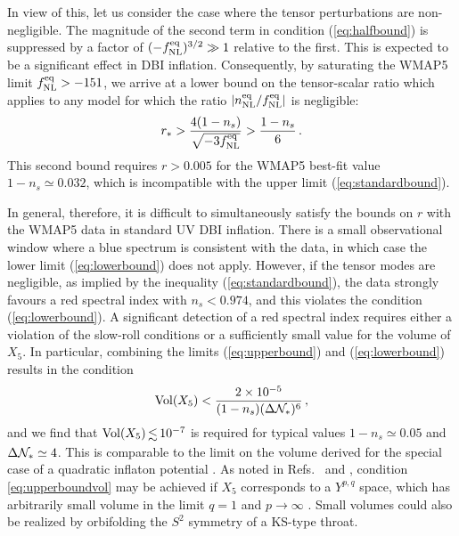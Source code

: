 In view of this, let us consider the case where the tensor 
perturbations are non-negligible. 
The magnitude of the second term in condition (\ref{eq:halfbound}) 
is suppressed by a factor of $(-f_{\mathrm{NL}}^{\mathrm{eq}})^{3/2} \gg 1$ 
relative to the first. This is expected to 
be a significant effect in DBI inflation. 
Consequently, 
by saturating the WMAP5 limit $f_{\mathrm{NL}}^{\mathrm{eq}} > -151$, we arrive at 
a lower bound on the tensor-scalar ratio which applies   
to any model for which the ratio $|n_{\mathrm{NL}}^{\mathrm{eq}}/f_{\mathrm{NL}}^{\mathrm{eq}}|$ is 
negligible:
% 
\begin{equation}
\label{eq:lowerbound}
r_* >  \frac{4(1-n_s)}{\sqrt{-3f_{\mathrm{NL}}^{\mathrm{eq}}}} > \frac{1-n_s}{6} \,.
\end{equation}
% 
This second bound requires $r > 0.005$ for the WMAP5 best-fit value 
$1-n_s \simeq 0.032$, which is incompatible with the upper limit 
(\ref{eq:standardbound}). 


In general, therefore, it is difficult to simultaneously satisfy 
the bounds on $r$ with the WMAP5 data
in standard UV DBI inflation. There is a 
small observational window where a blue spectrum is consistent 
with the data, in which case the lower limit 
(\ref{eq:lowerbound}) does not apply. 
However, if the tensor modes are negligible,
as implied by the inequality (\ref{eq:standardbound}), the 
data strongly favours a red spectral index with $n_s < 0.974$,
and this violates the condition (\ref{eq:lowerbound}). A significant 
detection of a red spectral index requires either a 
violation of the slow-roll conditions or a sufficiently 
small value for the volume of $X_5$. 
In particular, combining the limits
(\ref{eq:upperbound}) and (\ref{eq:lowerbound}) results in the condition 
% 
\begin{equation}
\label{eq:upperboundvol}
\mathrm{Vol}(X_5) < \frac{2 \times 10^{-5}}{(1-n_s) 
(\Delta \mathcal{N}_{*} )^6}  \,,
\end{equation}
% 
and we find that $\mathrm{Vol}(X_5) \, \lsim \, 10^{-7}$ 
is required for typical values $1-n_s \simeq 0.05$ and 
$\Delta \mathcal{N}_* \simeq 4$. 
This 
is comparable to the limit on the volume derived for the special case of a 
quadratic inflaton potential \cite{bmpaper}.  
As noted in Refs.~\cite{bmpaper} and \cite{bean}, condition 
\eqref{eq:upperboundvol} may be achieved 
if $X_5$ corresponds to a $Y^{p,q}$ space, 
which has arbitrarily small volume in the limit  
$q =1$ and $p \rightarrow \infty$ \cite{gauntlett}. 
Small volumes could also be realized 
by orbifolding the $S^2$ symmetry of a KS-type throat. 


